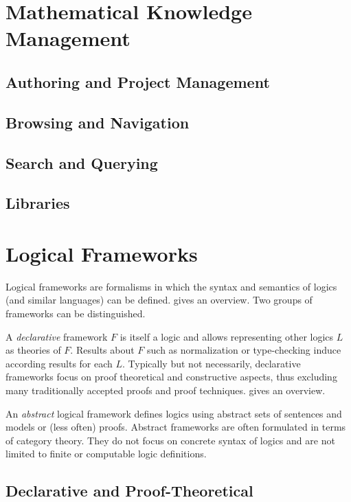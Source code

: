 \documentclass[12pt]{article}
\begin{document}
\section{Mathematical Knowledge Management}

\subsection{Authoring and Project Management}

\subsection{Browsing and Navigation}

\subsection{Search and Querying}

\subsection{Libraries}

\section{Logical Frameworks}

Logical frameworks are formalisms in which the syntax and semantics of logics (and similar languages) can be defined.
\cite{rabe:howto:14} gives an overview.
Two groups of frameworks can be distinguished.

A \emph{declarative} framework $F$ is itself a logic and allows representing other logics $L$ as theories of $F$.
Results about $F$ such as normalization or type-checking induce according results for each $L$.
Typically but not necessarily, declarative frameworks focus on proof theoretical and constructive aspects, thus excluding many traditionally accepted proofs and proof techniques.
\cite{logicalframeworks} gives an overview.

An \emph{abstract} logical framework defines logics using abstract sets of sentences and models or (less often) proofs.
Abstract frameworks are often formulated in terms of category theory.
They do not focus on concrete syntax of logics and are not limited to finite or computable logic definitions.

\subsection{Declarative and Proof-Theoretical}
\end{document}
